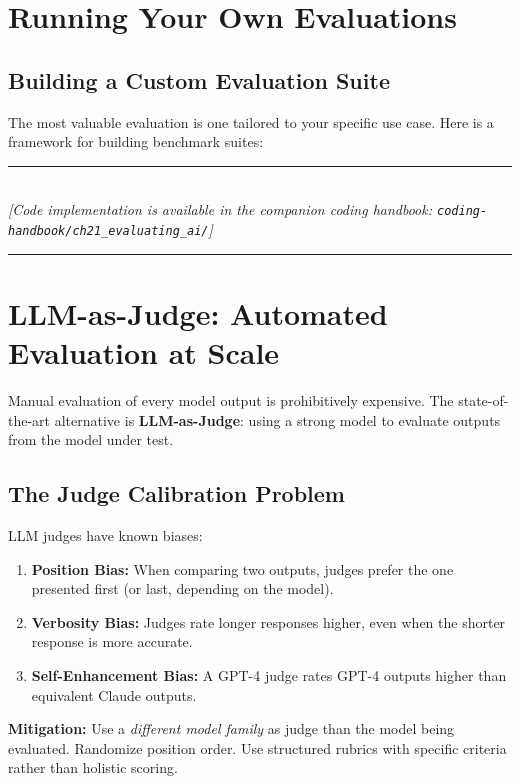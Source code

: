 \section{Running Your Own Evaluations}

\subsection{Building a Custom Evaluation Suite}

The most valuable evaluation is one tailored to your specific use case. Here is a framework for building benchmark suites:


\begin{center}
\noindent\rule{0.6\textwidth}{0.4pt} \\
\vspace{0.3em}
\textit{[Code implementation is available in the companion coding handbook: \texttt{coding-handbook/ch21\_evaluating\_ai/}]} \\
\noindent\rule{0.6\textwidth}{0.4pt}
\end{center}


\section{LLM-as-Judge: Automated Evaluation at Scale}

Manual evaluation of every model output is prohibitively expensive. The state-of-the-art alternative is \textbf{LLM-as-Judge}: using a strong model to evaluate outputs from the model under test.

\subsection{The Judge Calibration Problem}

LLM judges have known biases:
\begin{enumerate}
    \item \textbf{Position Bias:} When comparing two outputs, judges prefer the one presented first (or last, depending on the model).
    \item \textbf{Verbosity Bias:} Judges rate longer responses higher, even when the shorter response is more accurate.
    \item \textbf{Self-Enhancement Bias:} A GPT-4 judge rates GPT-4 outputs higher than equivalent Claude outputs.
\end{enumerate}

\textbf{Mitigation:} Use a \textit{different model family} as judge than the model being evaluated. Randomize position order. Use structured rubrics with specific criteria rather than holistic scoring.

